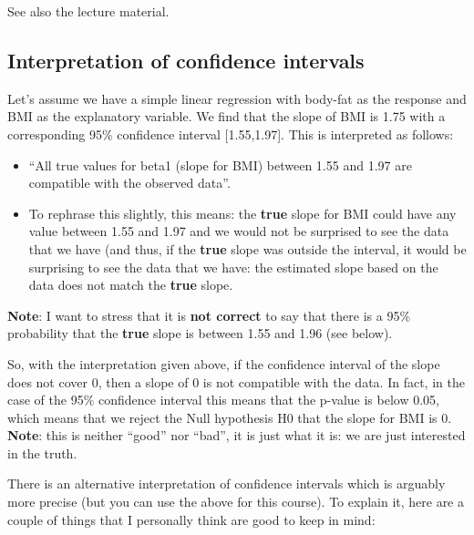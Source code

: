 \documentclass[
  letterpaper,
  8pt,
  a4paper]{book}
\providecommand{\tightlist}{%
  \setlength{\itemsep}{0pt}\setlength{\parskip}{0pt}}
\begin{document}
See also the lecture material.

\subsection*{Interpretation of confidence
intervals}\label{interpretation-of-confidence-intervals}

Let's assume we have a simple linear regression with body-fat as the
response and BMI as the explanatory variable. We find that the slope of
BMI is 1.75 with a corresponding 95\% confidence interval
{[}1.55,1.97{]}. This is interpreted as follows:

\begin{itemize}
\tightlist
\item
  ``All true values for beta1 (slope for BMI) between 1.55 and 1.97 are
  compatible with the observed data''.
\item
  To rephrase this slightly, this means: the \textbf{true} slope for BMI
  could have any value between 1.55 and 1.97 and we would not be
  surprised to see the data that we have (and thus, if the \textbf{true}
  slope was outside the interval, it would be surprising to see the data
  that we have: the estimated slope based on the data does not match the
  \textbf{true} slope.
\end{itemize}

\textbf{Note}: I want to stress that it is \textbf{not correct} to say
that there is a 95\% probability that the \textbf{true} slope is between
1.55 and 1.96 (see below).

So, with the interpretation given above, if the confidence interval of
the slope does not cover 0, then a slope of 0 is not compatible with the
data. In fact, in the case of the 95\% confidence interval this means
that the p-value is below 0.05, which means that we reject the Null
hypothesis H0 that the slope for BMI is 0. \textbf{Note}: this is
neither ``good'' nor ``bad'', it is just what it is: we are just
interested in the truth.

There is an alternative interpretation of confidence intervals which is
arguably more precise (but you can use the above for this course). To
explain it, here are a couple of things that I personally think are good
to keep in mind:
\end{document}
